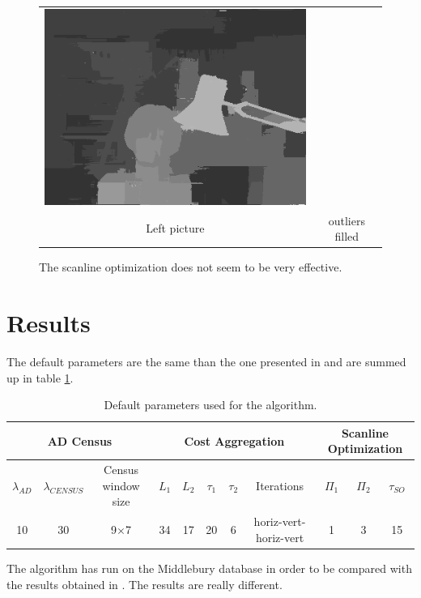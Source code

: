 \documentclass{article}
\begin{document}
\begin{figure}[h]
\begin{center}
\begin{tabular}{cc}
\includegraphics[scale=0.5]{Images/ADCensus_aggregated_so/disparity_occlusion_filled_smoothed.png}\\
Left picture & outliers filled
\end{tabular}
	\caption{The scanline optimization does not seem to be very effective.}
	\label{refinePics}
\end{center}
\end{figure}

\newpage

\section{Results}

The default parameters are the same than the one presented in \cite{adCensus} and are summed up in table \ref{params}.
\begin{table}[htbp]
\begin{center}
  \begin{tabular}{||c|c|c||c|c|c|c|c||c|c|c||}
		\hline
		\multicolumn{3}{||c||}{AD Census} & \multicolumn{5}{c||}{Cost Aggregation} & \multicolumn{3}{c||}{Scanline Optimization}\\
		\hline
		$\lambda_{AD}$ & $\lambda_{CENSUS}$ & Census window size & $L_1$ & $L_2$ & $\tau_1$ & $\tau_2$ & Iterations & $\Pi_1$ & $\Pi_2$ & $\tau_{SO}$\\
		\hline
		10 & 30 & 9$\times$7 & 34 & 17 & 20 & 6 & horiz-vert-horiz-vert & 1 & 3 & 15\\
		\hline
\end{tabular}
\end{center}
\caption{Default parameters used for the algorithm.}
\label{params}
\end{table}

The algorithm has run on the Middlebury database in order to be compared with the results obtained in \cite{adCensus}. The results are really different.
\end{document}
